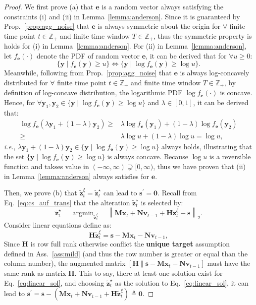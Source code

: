 \documentclass{article}
\theoremstyle{plain}
\theoremstyle{definition}
\theoremstyle{remark}
\def \ie {\textit{i.e.}}
\def \Eq {Eq.}
\def \prop {Prop.}
\def \x {\mathbf{x}}
\def \N {\mathbf{N}}
\def \s {\mathbf{s}}
\def \M {\mathbf{M}}
\def \H {\mathbf{H}}
\def \e {\mathbf{e}}
\def \v {\mathbf{v}}
\def \z {\mathbf{z}}
\begin{document}
\begin{proof}
  We first prove (a) that \(\e\) is a random vector always satisfying the constraints (i) and (ii) in Lemma~\ref{lemma:anderson}. Since it is guaranteed by \prop~\ref{prop:agg_noise} that \(\e\) is always symmetric about the origin for \(\forall\) finite time point \(t\in \mathbb{Z}_+\) and finite time window \(T\in \mathbb{Z}_+\), thus the symmetric property is holds for (i) in Lemma~\ref{lemma:anderson}. 
  For (ii) in Lemma~\ref{lemma:anderson}, let \(f_\e(\cdot)\) denote the PDF of random vector \(\e\), it can be derived that for \(\forall u \geq 0\):
  \[
    \{\boldsymbol{y} \mid f_\e(\boldsymbol{y}) \geq u\} \Leftrightarrow \{\boldsymbol{y} \mid \log f_\e(\boldsymbol{y}) \geq \log u\}.
  \]
  Meanwhile, following from \prop~\ref{prop:agg_noise} that \(\e\) is always log-concavely distributed for \(\forall\) finite time point \(t\in \mathbb{Z}_+\) and finite time window \(T\in \mathbb{Z}_+\), by definition of log-concave distribution, the logarithmic PDF \(\log f_\e(\cdot)\) is concave. Hence, for \(\forall \boldsymbol{y}_1, \boldsymbol{y}_2 \in \{\boldsymbol{y} \mid \log f_\e(\boldsymbol{y}) \geq \log u\} \) and \(\lambda \in [0, 1]\), it can be derived that:
  \[
  \begin{aligned}
    \log f_\e(\lambda \boldsymbol{y}_1 + (1-\lambda) \boldsymbol{y}_2)\geq &\lambda \log f_\e(\boldsymbol{y}_1) +  (1-\lambda) \log f_\e( \boldsymbol{y}_2)\\
    \geq & \lambda\log u +  (1-\lambda) \log u = \log u, 
  \end{aligned}
  \]
  \ie, \(\lambda \boldsymbol{y}_1 + (1-\lambda) \boldsymbol{y}_2 \in \{\boldsymbol{y} \mid \log f_\e(\boldsymbol{y}) \geq \log u\}\) always holds, illustrating that the set \(\{\boldsymbol{y} \mid \log f_\e(\boldsymbol{y}) \geq \log u\}\) is always concave. Because \(\log u\) is a reversible function and takses value in \((-\infty, \infty)\supsetneq [0, \infty)\), thus we have proven that (ii) in Lemma~\ref{lemma:anderson} always satisfies for \(\e\).
  
  
  Then, we prove (b) that \(\tilde{\z}_t^\xi=\tilde{\z}_t^\star\) can lead to \(\s^\prime = \bm{0}\). Recall from \Eq~\eqref{eq:cs_auf_trans} that the alteration \(\tilde{\z}_t^\star\) is selected by:
  \[
    \tilde{\z}_t^\star = \mathop{\arg\min}_{\tilde{\z}_t^\xi}\quad \left\|\M\x_t + \N\v_{t-1} + \H\tilde{\z}_t^\xi - \s\right\|_2. 
  \]  
  Consider linear equations define as:
  \begin{equation}
    \label{eq:linear_sol}
    \H\tilde{\z}_t^\xi = \s - \M\x_t - \N\v_{t-1},
  \end{equation}
  Since \(\H\) is row full rank otherwise conflict the \textbf{unique target} assumption defined in Ass.~\ref{ass:mild} (and thus the row number is greater or equal than the column number), the augmented matrix \([\H \; \text{‖} \; \s - \M\x_t - \N\v_{t-1} ]\) must have the same rank as matrix \(\H\). 
  This to say, there at least one solution exist for \Eq~\eqref{eq:linear_sol}, and choosing \(\tilde{\z}_t^\star\) as the solution to \Eq~\eqref{eq:linear_sol}, it can lead to 
  \(\s^\prime=\s-(\M\x_t + \N\v_{t-1} + \H\tilde{\z}_t^\xi) \triangleq \bm{0}\). 


\end{proof}
\end{document}
